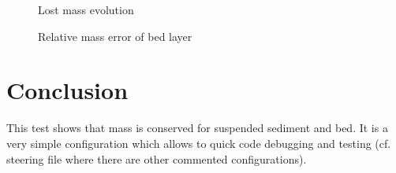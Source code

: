 \begin{figure} [h]
\centering
{}
\caption{Lost mass evolution}\label{bedmasserr}
\end{figure}
\begin{figure} [h]
\centering
{}
\caption{Relative mass error of bed layer}\label{relmasserr_ial}
\end{figure}

\section{Conclusion}
This test shows that mass is conserved for suspended sediment and bed. It is a very simple configuration which allows to quick code debugging and testing (cf. \gaia{} steering file where there are other commented configurations).
%


